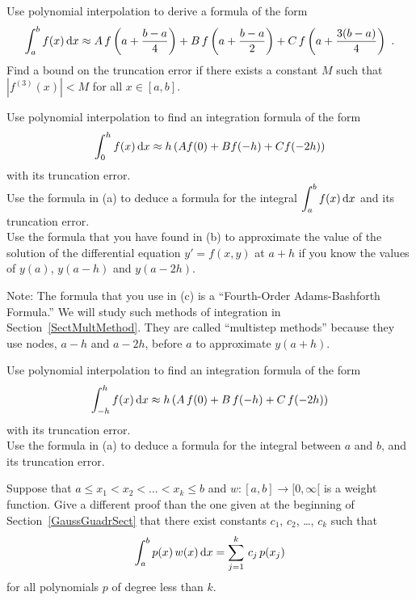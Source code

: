 \begin{question}
Use polynomial interpolation to derive a formula of the form
\[
\int_a^b f(x)\,\mathrm{d}x \approx A\,f\left(a + \frac{b-a}{4}\right)
+ B\,f\left(a+\frac{b-a}{2}\right)
+ C\,f\left(a+\frac{3(b-a)}{4}\right) \ .
\]
Find a bound on the truncation error if there exists a constant $M$
such that $|f^{(3)}(x)|<M$ for all $x\in[a,b]$.
\label{diffQ21}
\end{question}

\begin{question}
 Use polynomial interpolation to find an integration formula
of the form
\[
\int_0^h f(x)\,\mathrm{d}x \approx h\left(A f(0)+B f(-h)+C f(-2h)\right)
\]
with its truncation error.\\
 Use the formula in (a) to deduce a formula for the integral
$\displaystyle \int_a^b f(x)\,\mathrm{d}x$ and its truncation error.\\
 Use the formula that you have found in (b) to approximate the
value of the solution of the differential equation $y' = f(x,y)$ at
$a+h$ if you know the values of $y(a)$, $y(a-h)$ and $y(a-2h)$.

\noindent Note: The formula that you use in (c) is a ``Fourth-Order
Adams-Bashforth Formula.''  We will study such methods of integration in  
Section~\ref{SectMultMethod}.  They are called ``multistep methods''
because they use nodes, $a-h$ and $a-2h$, before $a$ to approximate
$y(a+h)$.
\label{diffQ22}
\end{question}

\begin{question}
 Use polynomial interpolation to find an integration formula
of the form
\[
\int_{-h}^h f(x)\,\mathrm{d}x \approx h\left(A\,f(0)+B\,f(-h)+C\,f(-2h)\right)
\]
with its truncation error.\\
 Use the formula in (a) to deduce a formula for the integral
between $a$ and $b$, and its truncation error.
\label{diffQ23}
\end{question}

\begin{question}
Suppose that $a \leq x_1 < x_2 < \ldots < x_k \leq b$ and
$w:[a,b]\to [0,\infty[$ is a weight function.   Give a different proof
than the one given at the beginning of Section~\ref{GaussGuadrSect} 
that there exist constants $c_1$, $c_2$, \ldots, $c_k$ such that
\begin{equation}\label{G_quadr}
\int_a^b p(x)\,w(x)\,\mathrm{d}x = \sum_{j=1}^k\,c_j\,p(x_j)
\end{equation}
for all polynomials $p$ of degree less than $k$.
\label{diffQ24}
\end{question}

